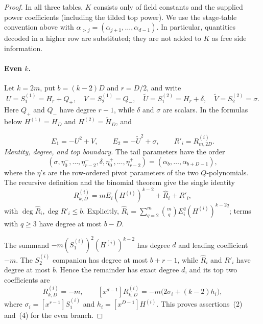 \begin{proof}
      In all three tables, $K$ consists only of field constants and the
      supplied power coefficients (including the tilded top power).  We use
      the stage-table convention above with
      $\alpha_{>j}=(\alpha_{j+1},\ldots,\alpha_{d-1})$.  In particular,
      quantities decoded in a higher row are substituted; they are not added
      to $K$ as free side information.

      \paragraph{Even $k$.}
      Let $k=2m$, put $b=(k-2)D$ and $r=D/2$, and write
      \[
        U=S^{(1)}_1=H_r+Q_+,\quad V=S^{(1)}_2=Q_-,\quad
        \widetilde U=S^{(2)}_1=H_r+\delta,\quad
        \widetilde V=S^{(2)}_2=\sigma.
      \]
      Here $Q_+$ and $Q_-$ have degree $r-1$, while $\delta$ and
      $\sigma$ are scalars.  In the formulas below $H^{(1)}=H_D$ and
      $H^{(2)}=\widetilde H_D$, and

      \[
      E_1=-U^2+V,\qquad E_2=-\widetilde U^2+\sigma,\qquad
      R'_i=R^{(i)}_{m,2D}.
      \]
      \smallskip\noindent\emph{Identity, degree, and top boundary.}
      The tail parameters have the order
      \[
        (\sigma,\eta^-_0,\ldots,\eta^-_{r-2},\delta,
          \eta^+_0,\ldots,\eta^+_{r-2})
        =(\alpha_{b},\ldots,\alpha_{b+D-1}),
        \tag{R-even-block}
      \]
      where the $\eta$'s are the row-ordered pivot parameters of the two
      $Q$-polynomials.
      The recursive definition and the binomial theorem give the single
      identity
      \[
        R^{(i)}_{k,D}=mE_i(H^{(i)})^{k-2}+\widehat R_i+R'_i,
        \tag{R-even-exp}
      \]
      with $\deg\widehat R_i,\deg R'_i\le b$.  Explicitly,
      $\widehat R_i=\sum_{q=2}^{m}\binom mq E_i^q(H^{(i)})^{k-2q}$;
      terms with $q\ge3$ have degree at most $b-D$.

      The summand $-m(S^{(i)}_1)^2(H^{(i)})^{k-2}$ has degree $d$ and
      leading coefficient $-m$.  The $S^{(i)}_2$ companion has degree at
      most $b+r-1$, while $\widehat R_i$ and $R'_i$ have degree at most
      $b$.  Hence the remainder has exact degree $d$, and its top two
      coefficients are
      \begin{equation}
        [x^d]R^{(i)}_{k,D}=-m,\qquad
        [x^{d-1}]R^{(i)}_{k,D}
          =-m\bigl(2\sigma_i+(k-2)h_i\bigr),
        \tag{R-top-two-even}\label{R-top-two-even}
      \end{equation}
      where $\sigma_i=[x^{r-1}]S^{(i)}_1$ and
      $h_i=[x^{D-1}]H^{(i)}$.  This proves assertions~(2) and~(4) for the
      even branch.


\end{proof}
